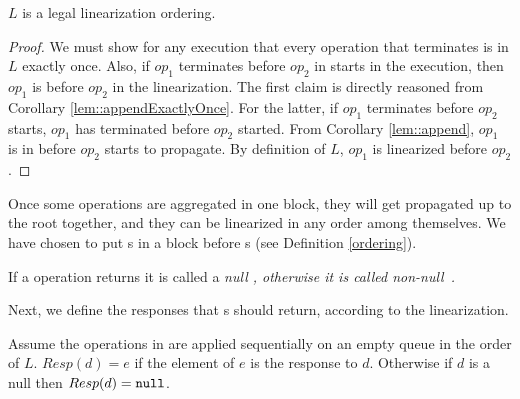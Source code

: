 \begin{lemma} \label{linearSat}
$L$ is a legal linearization ordering.
\end{lemma}
\begin{proof}
We must show for any execution that every operation that terminates is in $L$ exactly once. Also, if $op_{1}$ terminates before $op_{2}$ in starts in the execution, then $op_{1}$ is before $op_{2}$ in the linearization. The first claim is directly reasoned from Corollary \ref{lem::appendExactlyOnce}. For the latter, if $op_{1}$ terminates before $op_{2}$ starts,  $op_{1}$ has terminated before $op_{2}$ started. From Corollary \ref{lem::append}, $op_{1}$ is in  before $op_{2}$ starts to propagate. By definition of $L$, $op_{1}$ is linearized before $op_{2}$.
\end{proof}
Once some operations are aggregated in one block, they will get propagated up to the root together, and they can be linearized in any order among themselves. We have chosen to put s in a block before s (see Definition \ref{ordering}).

\begin{definition}\label{defNullDeq}
If a  operation returns  it is called a \it{null} , otherwise it is called \it{non-null}~.
\end{definition}

Next, we define the responses that s should return, according to the linearization.
\begin{definition}
   Assume the operations in  are applied sequentially on an empty queue in the order of $L$.  ${Resp(d)=e}$ if the element of  $e$ is the response to  $d$. Otherwise if ${d}$ is a null  then ${Resp(d)={\normalfont{\texttt{null}}}}$. 
\end{definition}

